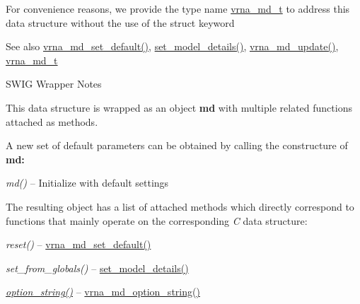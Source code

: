 For convenience reasons, we provide the type name \mbox{\hyperlink{group__model__details_ga1f8a10e12a0a1915f2a4eff0b28ea17c}{vrna\+\_\+md\+\_\+t}} to address this data structure without the use of the struct keyword

\begin{DoxySeeAlso}{See also}
\mbox{\hyperlink{group__model__details_ga8ac6ff84936282436f822644bf841f66}{vrna\+\_\+md\+\_\+set\+\_\+default()}}, \mbox{\hyperlink{group__model__details_gabad896c3650d420f3f3ddefc69e2bceb}{set\+\_\+model\+\_\+details()}}, \mbox{\hyperlink{group__model__details_ga36ae40b8c3b82362f5798ad5b047b814}{vrna\+\_\+md\+\_\+update()}}, \mbox{\hyperlink{group__model__details_ga1f8a10e12a0a1915f2a4eff0b28ea17c}{vrna\+\_\+md\+\_\+t}}
\end{DoxySeeAlso}
\begin{DoxyRefDesc}{S\+W\+I\+G Wrapper Notes}
\item[\mbox{\hyperlink{wrappers__wrappers000077}{S\+W\+I\+G Wrapper Notes}}]This data structure is wrapped as an object {\bfseries md} with multiple related functions attached as methods.

A new set of default parameters can be obtained by calling the constructure of {\bfseries md\+:} ~\newline

\begin{DoxyItemize}
\item {\itshape md()} -- Initialize with default settings
\end{DoxyItemize}

The resulting object has a list of attached methods which directly correspond to functions that mainly operate on the corresponding {\itshape C} data structure\+:~\newline

\begin{DoxyItemize}
\item {\itshape reset()} -- \mbox{\hyperlink{group__model__details_ga8ac6ff84936282436f822644bf841f66}{vrna\+\_\+md\+\_\+set\+\_\+default()}}
\item {\itshape set\+\_\+from\+\_\+globals()} -- \mbox{\hyperlink{group__model__details_gabad896c3650d420f3f3ddefc69e2bceb}{set\+\_\+model\+\_\+details()}}
\item {\itshape \mbox{\hyperlink{group__model__details_ga0ca65d37c515d6d36b06d3db1abb69d3}{option\+\_\+string()}}} -- \mbox{\hyperlink{group__model__details_ga3a7469f0725a849af6ba61a57dfd60ce}{vrna\+\_\+md\+\_\+option\+\_\+string()}}
\end{DoxyItemize}


\end{DoxyRefDesc}
